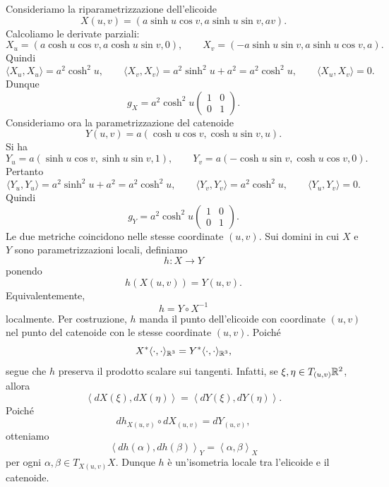 \documentclass[a4paper]{article}
\begin{document}
\begin{snippetproof}{}
    Consideriamo la riparametrizzazione dell'elicoide
    \[
        X(u,v)=
        \left(
            a\sinh u\cos v,
            a\sinh u\sin v,
            av
        \right).
    \]
    Calcoliamo le derivate parziali:
    \[
        X_u=
        \left(
            a\cosh u\cos v,
            a\cosh u\sin v,
            0
        \right),
        \qquad
        X_v=
        \left(
            -a\sinh u\sin v,
            a\sinh u\cos v,
            a
        \right).
    \]
    Quindi
    \[
        \langle X_u,X_u\rangle=a^2\cosh^2u,
        \qquad
        \langle X_v,X_v\rangle=a^2\sinh^2u+a^2=a^2\cosh^2u,
        \qquad
        \langle X_u,X_v\rangle=0.
    \]
    Dunque
    \[
        g_X=
        a^2\cosh^2u
        \begin{pmatrix}
            1 & 0\\
            0 & 1
        \end{pmatrix}.
    \]
    Consideriamo ora la parametrizzazione del catenoide
    \[
        Y(u,v)=
        a\left(
            \cosh u\cos v,
            \cosh u\sin v,
            u
        \right).
    \]
    Si ha
    \[
        Y_u=
        a\left(
            \sinh u\cos v,
            \sinh u\sin v,
            1
        \right),
        \qquad
        Y_v=
        a\left(
            -\cosh u\sin v,
            \cosh u\cos v,
            0
        \right).
    \]
    Pertanto
    \[
        \langle Y_u,Y_u\rangle=a^2\sinh^2u+a^2=a^2\cosh^2u,
        \qquad
        \langle Y_v,Y_v\rangle=a^2\cosh^2u,
        \qquad
        \langle Y_u,Y_v\rangle=0.
    \]
    Quindi
    \[
        g_Y=
        a^2\cosh^2u
        \begin{pmatrix}
            1 & 0\\
            0 & 1
        \end{pmatrix}.
    \]
    Le due metriche coincidono nelle stesse coordinate \((u,v)\). Sui domini in cui \(X\) e \(Y\) sono parametrizzazioni locali, definiamo
    \[
        h\colon X\to Y
    \]
    ponendo
    \[
        h(X(u,v))=Y(u,v).
    \]
    Equivalentemente,
    \[
        h=Y\circ X^{-1}
    \]
    localmente. Per costruzione, \(h\) manda il punto dell'elicoide con coordinate \((u,v)\) nel punto del catenoide con le stesse coordinate \((u,v)\).
    Poiché
    \[
        X^*\langle\cdot,\cdot\rangle_{\mathbb{R}^3}
        =
        Y^*\langle\cdot,\cdot\rangle_{\mathbb{R}^3},
    \]
    segue che \(h\) preserva il prodotto scalare sui tangenti. Infatti, se \(\xi,\eta\in T_{(u,v)}\mathbb{R}^2\), allora
    \[
        \left\langle dX(\xi),dX(\eta)\right\rangle
        =
        \left\langle dY(\xi),dY(\eta)\right\rangle.
    \]
    Poiché
    \[
        dh_{X(u,v)}\circ dX_{(u,v)}=dY_{(u,v)},
    \]
    otteniamo
    \[
        \left\langle dh(\alpha),dh(\beta)\right\rangle_Y
        =
        \left\langle \alpha,\beta\right\rangle_X
    \]
    per ogni \(\alpha,\beta\in T_{X(u,v)}X\). Dunque \(h\) è un'isometria locale tra l'elicoide e il catenoide.
\end{snippetproof}
\end{document}
